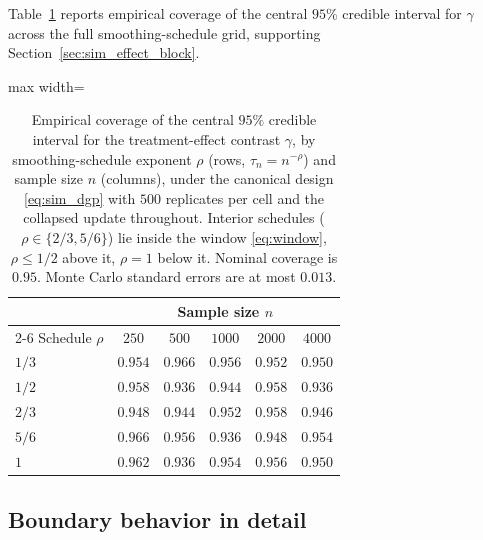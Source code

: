 \documentclass[11pt]{article}
\theoremstyle{definition}
\theoremstyle{plain}
\begin{document}
Table~\ref{tab:sim_gamma_coverage} reports empirical coverage of the central $95\%$ credible interval for $\gamma$ across the full smoothing-schedule grid, supporting Section~\ref{sec:sim_effect_block}.

\begin{table}[!htbp]
  \centering
  \caption{Empirical coverage of the central $95\%$ credible interval for the treatment-effect contrast $\gamma$, by smoothing-schedule exponent $\rho$ (rows, $\tau_n=n^{-\rho}$) and sample size $n$ (columns), under the canonical design \eqref{eq:sim_dgp} with $500$ replicates per cell and the collapsed update throughout. Interior schedules ($\rho\in\{2/3,5/6\}$) lie inside the window \eqref{eq:window}, $\rho\le1/2$ above it, $\rho=1$ below it. Nominal coverage is $0.95$. Monte Carlo standard errors are at most $0.013$.}
  \label{tab:sim_gamma_coverage}
  \begin{adjustbox}{max width=\textwidth}
  \begin{tabular}{lccccc}
    \toprule
    & \multicolumn{5}{c}{Sample size $n$}\\
    \cmidrule(lr){2-6}
    Schedule $\rho$ & $250$ & $500$ & $1000$ & $2000$ & $4000$\\
    \midrule
    $1/3$ & $0.954$ & $0.966$ & $0.956$ & $0.952$ & $0.950$\\
    $1/2$ & $0.958$ & $0.936$ & $0.944$ & $0.958$ & $0.936$\\
    $2/3$ & $0.948$ & $0.944$ & $0.952$ & $0.958$ & $0.946$\\
    $5/6$ & $0.966$ & $0.956$ & $0.936$ & $0.948$ & $0.954$\\
    $1$   & $0.962$ & $0.936$ & $0.954$ & $0.956$ & $0.950$\\
    \bottomrule
  \end{tabular}
  \end{adjustbox}
\end{table}

\subsection{Boundary behavior in detail}
\end{document}
